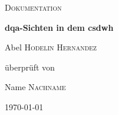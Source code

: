 \begin{titlepage}
	\thispagestyle{firstpage}
	
	\centering
	\vspace*{5cm}
	{\scshape\LARGE Dokumentation\par}
	\vspace{1.5cm}
	{\huge \bfseries \acs{dqa}-Sichten in dem \acs{csdwh}\par}
	\vspace{2cm}
	{\Large Abel \textsc{Hodelin Hernandez}\par} 
	\vspace{2cm}
	überprüft von\par
	Name \textsc{Nachname}
	\vfill
	
	{\large \today\par}
\end{titlepage}